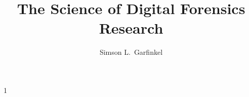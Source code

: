 \documentclass[11pt,letter]{article}
\begin{document}
\title{The Science of Digital Forensics Research}
\author{Simson L.\ Garfinkel}
\maketitle
{}


% 

\newcommand{\chapter}[1]{}
\renewcommand{\section}[1]{\noindent\textbf{\textsc{#1}}}
\renewcommand{\subsection}[1]{\noindent\textbf{#1}}
\newcommand{\citep}[1]{\nocite{#1}}
\newcommand{\citet}[1]{\nocite{#1}}
\renewcommand{\cite}[1]{\nocite{#1}}



      1
% 
%
%
%



\renewcommand{\refname}{}
\renewcommand{\bibitem}[2][]{~\\~\\}
\def\showURL{}
\def\urlprefix{}
{\fontsize{9}{10}\selectfont
  

%
}
\end{document}
